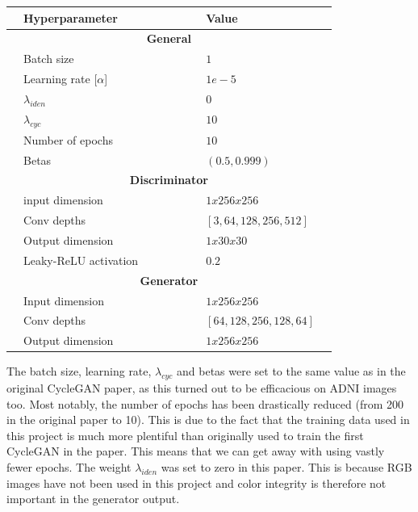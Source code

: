 \documentclass[12pt, fleqn, titlepage]{article}
\begin{document}
	\begin{table}[H]
	\centering
	\begin{tabular}{l l l l l l l l l}
		\toprule
		& \textbf{Hyperparameter}           &&&&& & \textbf{Value}   & \\ \midrule
		& \multicolumn{7}{c}{\textbf{General}}          & \\
		& Batch size              &&&&& & $1$           & \\
		& Learning rate [$\alpha$]&&&&& & $1e-5$        & \\
		& $\lambda_{iden}$        &&&&& & $0$           & \\
		& $\lambda_{cyc}$         &&&&& & $10$          & \\
		& Number of epochs        &&&&& & $10$          & \\
		& Betas                   &&&&& & $(0.5, 0.999)$& \\
		& \multicolumn{7}{c}{\textbf{Discriminator}}    & \\
		& input dimension         &&&&& & $1x256x256$   & \\
		& Conv depths             &&&&& & $\left[3, 64, 128, 256, 512\right]$& \\
		& Output dimension        &&&&& & $1x30x30$     & \\
		& Leaky-ReLU activation   &&&&& & $0.2$         & \\
		& \multicolumn{7}{c}{\textbf{Generator}}        & \\
		& Input dimension         &&&&& & $1x256x256$   & \\
		& Conv depths             &&&&& & $\left[64, 128, 256, 128, 64\right]$              & \\
		& Output dimension        &&&&& & $1x256x256$   & \\ \bottomrule
	\end{tabular}
\end{table} 
The batch size, learning rate, $\lambda_{cyc}$ and betas were set to the same value as in the original CycleGAN paper, as this turned out to be efficacious on ADNI images too. Most notably, the number of epochs has been drastically reduced (from 200 in the original paper to 10). This is due to the fact that the training data used in this project is much more plentiful than originally used to train the first CycleGAN in the paper. This means that we can get away with using vastly fewer epochs. The weight $\lambda_{iden}$ was set to zero in this paper. This is because RGB images have not been used in this project and color integrity is therefore not important in the generator output.
\end{document}
